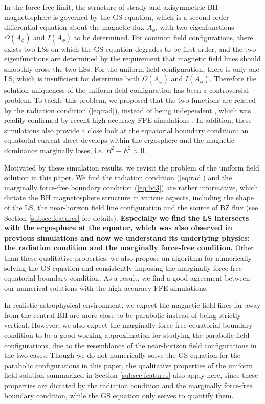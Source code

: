 \documentclass[aps,prd,reprint,nofootinbib, superscriptaddress]{revtex4-1}
\def\Ap{A_\phi}
\begin{document}
In the force-free limit, the structure of steady and axisymmetric BH magnetosphere is governed by
the GS equation, which is a second-order differential equation about the magnetic flux $\Ap$, with two
eigenfunctions $\Omega(\Ap)$ and $I(\Ap)$ to be determined. For common field configurations, there exists
two LSs on which the GS equation degrades to be first-order, and the two eigenfunctions are determined
by the requirement that magnetic field lines should smoothly cross the two LSs.
For the uniform field configuration, there is only one
LS, which is insufficient for determine both  $\Omega(\Ap)$ and $I(\Ap)$.
Therefore the solution uniqueness of the uniform field configuration has been a controversial problem.
To tackle this problem, we  proposed that the two functions are related by the radiation condition (\ref{eq:rad}),
instead of being independent \cite{Pan2017}, which was readily confirmed by recent high-accuracy
FFE simulations \cite{East2018}. In addition, these simulations also provide a close look at the
equatorial boundary condition: an equatorial current sheet develops within the ergosphere and the magnetic dominance marginally loses, i.e. $B^2-E^2\approx 0$.

Motivated by these simulation results, we revisit the problem of the uniform field solution in this paper.
We find the radiation condition (\ref{eq:rad}) and the marginally force-free boundary
condition (\ref{eq:bc3}) are rather informative, which dictate the BH magnetosphere structure
in various aspects, including the shape of the LS, the near-horizon field line configuration and
the source of BZ flux (see Section \ref{subsec:features} for details). {\bf Especially we find the LS
intersects with the ergosphere at the equator, which was also observed in previous simulations \cite[e.g.][]{Carrasco2017, East2018}
and now we understand its underlying physics: the radiation condition and the marginally force-free condition.}
Other than these qualitative properties,
we also propose an algorithm for numerically solving the GS equation and consistently imposing
the marginally force-free equatorial boundary condition. As a result, we find a good agreement
between our numerical solutions with the high-accuracy FFE simulations.

In realistic astrophysical environment, we expect the magnetic field lines far away from the central BH
are more close to be parabolic instead of being strictly vertical. However, we also expect the marginally
force-free equatorial boundary condition to be a good working approximation for studying the parabolic field configurations,
due to the resemblance of the near-horizon field configurations in the two cases.
Though we do not numerically solve the GS equation for the parabolic configurations in this paper, the qualitative
properties of the uniform field solution summarized in Section \ref{subsec:features} also apply here,
since these properties are dictated by the radiation condition
and the marginally force-free boundary condition, while the GS equation only serves to quantify them.
\end{document}

